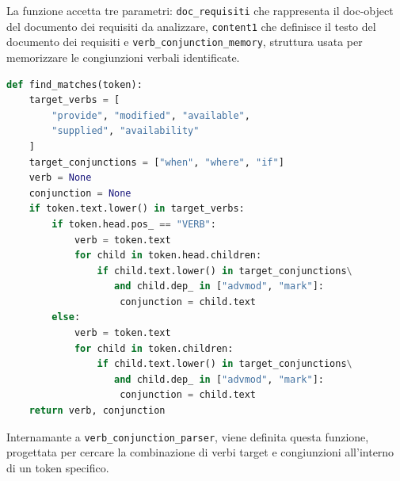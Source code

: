 \documentclass[12pt]{report}
\newcommand{\toody}{\textsl{TooDY}\xspace}
\begin{document}
\noindent La funzione accetta tre parametri: \texttt{doc\_requisiti} che rappresenta il doc-object del documento dei requisiti da analizzare, \texttt{content1} che definisce il testo del documento dei requisiti e \texttt{verb\_conjunction\_memory}, struttura usata per memorizzare le congiunzioni verbali identificate.




\begin{mdframed}
\small
\begin{lstlisting}[language=Python]
def find_matches(token):
    target_verbs = [
        "provide", "modified", "available",
        "supplied", "availability"
    ]
    target_conjunctions = ["when", "where", "if"]
    verb = None
    conjunction = None
    if token.text.lower() in target_verbs:
        if token.head.pos_ == "VERB":
            verb = token.text
            for child in token.head.children:
                if child.text.lower() in target_conjunctions\
                   and child.dep_ in ["advmod", "mark"]:
                    conjunction = child.text
        else:
            verb = token.text
            for child in token.children:
                if child.text.lower() in target_conjunctions\
                   and child.dep_ in ["advmod", "mark"]:
                    conjunction = child.text
    return verb, conjunction
\end{lstlisting}
\end{mdframed}

\noindent Internamante a \texttt{verb\_conjunction\_parser}, viene definita questa funzione, progettata per cercare la combinazione di verbi target e congiunzioni all'interno di un token specifico.
\end{document}
